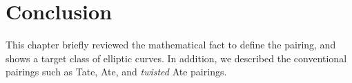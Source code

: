 

\section{Conclusion}
This chapter briefly reviewed the mathematical fact to define the pairing, and shows a target class of elliptic curves.
In addition, we described the conventional pairings such as Tate, Ate, and {\it twisted} Ate pairings.

